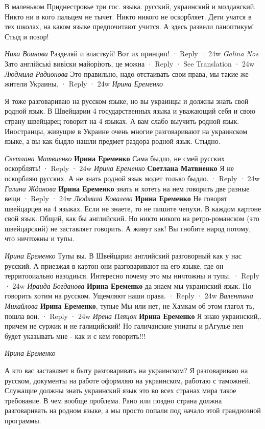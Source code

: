 \begin{itemize}
В маленьком Приднестровье три гос. языка. русский, украинский и молдавский.
Никто ни в кого пальцем не тычет. Никто никого не оскорбляет. Дети учатся в тех
школах, на каком языке предпочитают учится. А здесь развели паноптикум! Стыд и
позор!

\emph{Ника Воинова}
Разделяй и властвуй! Вот их принцип!
 · Reply · 24w
\emph{Galina Nos}
Зато англійські вивіски майоріють, це можна
 · Reply · See Translation · 24w
\emph{Людмила Радионова}
Это правильно, надо отстаивать свои права, мы такие же жители Украины.
 · Reply · 24w
\emph{Ирина Еременко}

Я тоже разговариваю на русском языке, но вы украинцы и должны знать свой родной
язык. В Швейцарии 4 государственных языка и уважающий себя и свою страну
швейцарец говорит на 4 языках. А вам слабо выучить родной язык. Иностранцы,
живущие в Украине очень многие разговаривают на украинском языке, а вы как
быдло нашли предмет раздора родной язык. Стыдно.

\begin{itemize}
\emph{Светлана Матвиенко}
\textbf{Ирина Еременко} Сама быдло, не смей русских оскорблять!
 · Reply · 24w
\emph{Ирина Еременко}
\textbf{Светлана Матвиенко} Я не оскорбляю русских. А не знать родной язык модет только быдло.
 · Reply · 24w
\emph{Галина Жданова}
\textbf{Ирина Еременко} знать и хотеть на нем говорить две разные вещи
 · Reply · 24w
\emph{Людмила Ковалева}
\textbf{Ирина Еременко} Не говорят швейцарцев на 4 языках. Если не знаете, то не
пишите чепухи. В каждом картоне свой язык. Общий, как бы английский. Но никто
никого на ретро-романском (это швейцарский) не заставляет говорить. А живут
как! Вы гнобите народ потому, что ничтожны и тупы.

\emph{Ирина Еременко}
Тупы вы. В Швейцарии английский разговорный как у нас русский. А приезжая в
картон они разговаривают на его языке, где он территооиально назодиься.
Интересно почему это мы ничтожны и тупы.
 · Reply · 24w
\emph{Ираида Богданова}
\textbf{Ирина Еременко} да знаем мы украинский язык. Но говорить хотим на русском. Ущемляют наши права.
 · Reply · 24w
\emph{Валентина Михайлова}
\textbf{Ирина Еременко}, тупые Мы или нет, не Хамкам об этом глагол ть, пошла вон.
 · Reply · 24w
\emph{Ирена Пляцок}
\textbf{Ирина Еременко} Я знаю украинский,. причем не суржик и не галицийский!
Но галичанские униаты и рАгулье нен будет указывать мне - как и с кем
говорить!!!

\emph{Ирина Еременко}

А кто вас заставляет в быту разговаривать на украинском? Я разговариваю на
русском, документы на работе оформляю на украинском, работаю с таможней.
Служащие должны знать украинский язык это во всех странах мира такое
требование. В чем вообще проблема. Рано или поздно страна должна разговаривать
на родном языке, а мы просто попали под начало этой грандиозной программы.


\end{itemize}
\end{itemize}
